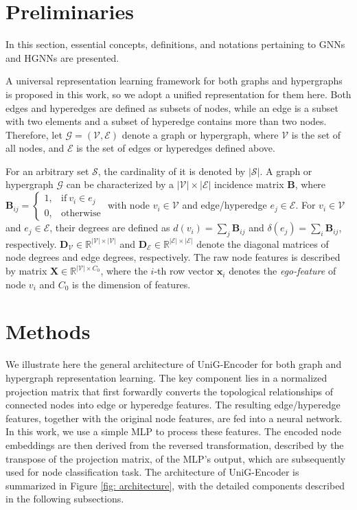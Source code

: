 \documentclass[review]{elsarticle}
\begin{document}
\section{Preliminaries}
In this section, essential concepts, definitions, and notations pertaining to GNNs and HGNNs are presented.

A universal representation learning framework for both graphs and hypergraphs is proposed in this work, so we adopt a unified representation for them here. Both edges and hyperedges are defined as subsets of nodes, while an edge is a subset with two elements and a subset of hyperedge contains more than two nodes. Therefore, let $\mathcal{G}=(\mathcal{V},\mathcal{E})$ denote a graph or hypergraph, where $\mathcal{V}$ is the set of all nodes, and $\mathcal{E}$ is the set of edges or hyperedges defined above.

For an arbitrary set $\mathcal{S}$, the cardinality of it is denoted by $|\mathcal{S}|$. A graph or hypergraph $\mathcal{G}$ can be characterized by a $|\mathcal{V}|\times|\mathcal{E}|$ incidence matrix $\mathbf{B}$, where $\mathbf{B}_{ij}={\begin{cases}{1,}&{{\mathrm{if~}}v_i\in e_j}\\{0,}&{{\mathrm{otherwise}}}\end{cases}}$ with node $v_i\in\mathcal{V}$ and edge/hyperedge $e_j\in\mathcal{E}$. For $v_i\in\mathcal{V}$ and $e_j\in\mathcal{E}$, their degrees are defined as $d(v_i)=\sum\limits_{j}\textbf{B}_{ij}$ and $\delta(e_j)=\sum\limits_{i}\mathbf{B}_{ij}$, respectively. $\mathbf{D}_\mathcal{V}\in\mathbb{R}^{|\mathcal{V}|\times|\mathcal{V}|}$ and $\mathbf{D}_\mathcal{E}\in\mathbb{R}^{|\mathcal{E}|\times|\mathcal{E}|}$ denote the diagonal matrices of node degrees and edge degrees, respectively. The raw node features is described by matrix $\mathbf{X}\in\mathbb{R}^{|\mathcal{V}|\times{C_0}}$, where the $i$-th row vector $\mathbf{x}_i$ denotes the {\it ego-feature} of node $v_i$ and ${C_0}$ is the dimension of features.

\section{Methods}

We illustrate here the general architecture of UniG-Encoder for both graph and hypergraph representation learning. The key component lies in a normalized projection matrix that first forwardly converts the topological relationships of connected nodes into edge or hyperedge features. The resulting edge/hyperedge features, together with the original node features, are fed into a neural network. In this work, we use a simple MLP to process these features. The encoded node embeddings are then derived from the reversed transformation, described by the transpose of the projection matrix, of the MLP's output, which are subsequently used for node classification task. The architecture of UniG-Encoder is summarized in Figure \ref{fig: architecture}, with the detailed components described in the following subsections.
\end{document}
